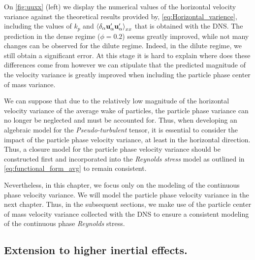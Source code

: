 On \ref{fig:uuxx} (left) we display the numerical values of the horizontal velocity variance against the theoretical results provided by, \ref{eq:Horizontal_varience}, including the values of $k_p$ and $\left<\delta_\alpha \textbf{u}_\alpha'\textbf{u}_\alpha'\right>_{xx}$ that is obtained with the DNS. 
The prediction in the dense regime ($\phi = 0.2$) seems greatly improved, while not many changes can be observed for the dilute regime. 
Indeed, in the dilute regime, we still obtain a significant error. 
At this stage it is hard to explain where does these differences come from however we can stipulate that the predicted magnitude of the velocity variance is greatly improved when including the particle phase center of mass variance. 

We can suppose that due to the relatively low magnitude of the horizontal velocity variance of the average wake of particles, the particle phase variance can no longer be neglected and must be accounted for. 
Thus, when developing an algebraic model for the \textit{Pseudo-turbulent} tensor, it is essential to consider the impact of the particle phase velocity variance, at least in the horizontal direction. 
Thus, a closure model for the particle phase velocity variance should be constructed first and incorporated into the \textit{Reynolds stress} model as outlined in \ref{eq:functional_form_avg} to remain consistent.

Nevertheless, in this chapter, we focus only on the modeling of the continuous phase velocity variance. 
We will model the particle phase velocity variance in the next chapter. 
Thus, in the subsequent sections, we make use of the particle center of mass velocity variance collected with the DNS to ensure a consistent modeling of the continuous phase \textit{Reynolds} stress.    


\subsection{Extension to higher inertial effects. }

